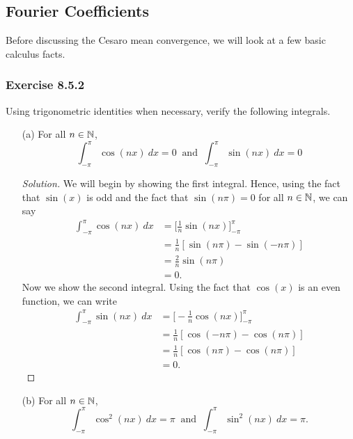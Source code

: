 \subsection{Fourier Coefficients}

Before discussing the Cesaro mean convergence, we will look at a few basic calculus facts.

\subsubsection{Exercise 8.5.2} Using trigonometric identities when necessary, verify the following integrals.
\begin{enumerate}
    \item[(a)] For all \( n \in \mathbb{N}  \), 
        \[  \int_{ - \pi  }^{ \pi  }  \cos(nx) \ dx = 0 \ \text{ and } \ \int_{ - \pi  }^{ \pi   } \sin(nx) \   dx = 0  \]
\begin{proof}[Solution]
    We will begin by showing the first integral. Hence, using the fact that \( \sin(x)  \) is odd and the fact that \( \sin(n \pi) = 0  \) for all \( n \in \mathbb{N}  \), we can say
    \begin{align*}
        \int_{ -\pi  }^{ \pi  } \cos(nx) \ dx &=  \Big[ \frac{ 1 }{ n }  \sin(nx)\Big]_{- \pi }^{\pi }  \\
                                              &= \frac{ 1 }{ n } [  \sin(n \pi ) - \sin(-n \pi)  ] \\
                                              &= \frac{ 2 }{ n }  \sin(n \pi) \\
                                              &= 0.
    \end{align*}
    Now we show the second integral. Using the fact that \( \cos(x) \) is an even function, we can write
    \begin{align*}
        \int_{ -\pi  }^{ \pi  } \sin(nx)  \ dx &= \Big[ -\frac{ 1 }{ n } \cos(nx) \Big]_{-\pi}^{\pi } \\
                                               &= \frac{ 1 }{ n } [  \cos(-n \pi) -\cos(n \pi)  ]  \\
                                               &= \frac{ 1 }{ n } [ \cos(n \pi) - \cos(n \pi )] \\
                                               &= 0.
    \end{align*}
\end{proof}
    \item[(b)] For all \( n \in \mathbb{N}  \),
        \[  \int_{ - \pi  }^{ \pi  }  \cos^{2}(nx) \ dx = \pi \ \text{ and } \ \int_{ - \pi  }^{ \pi   } \sin^{2}(nx) \   dx = \pi.  \]

\end{enumerate}
